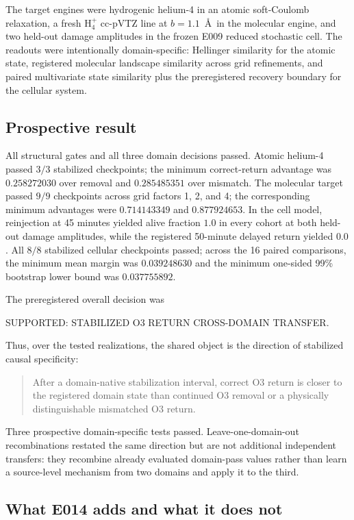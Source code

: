 \documentclass[11pt,a4paper]{article}
\newcommand{\statussupported}{\textsf{SUPPORTED}}
\begin{document}
The target engines were hydrogenic helium-4 in an atomic soft-Coulomb relaxation, a fresh H$_4^+$ cc-pVTZ line at $b=1.1$~\AA\ in the molecular engine, and two held-out damage amplitudes in the frozen E009 reduced stochastic cell. The readouts were intentionally domain-specific: Hellinger similarity for the atomic state, registered molecular landscape similarity across grid refinements, and paired multivariate state similarity plus the preregistered recovery boundary for the cellular system.

\subsection{Prospective result}

All structural gates and all three domain decisions passed. Atomic helium-4 passed $3/3$ stabilized checkpoints; the minimum correct-return advantage was $0.258272030$ over removal and $0.285485351$ over mismatch. The molecular target passed $9/9$ checkpoints across grid factors 1, 2, and 4; the corresponding minimum advantages were $0.714143349$ and $0.877924653$. In the cell model, reinjection at 45 minutes yielded alive fraction $1.0$ in every cohort at both held-out damage amplitudes, while the registered 50-minute delayed return yielded $0.0$. All $8/8$ stabilized cellular checkpoints passed; across the 16 paired comparisons, the minimum mean margin was $0.039248630$ and the minimum one-sided 99\% bootstrap lower bound was $0.037755892$.

The preregistered overall decision was
\begin{center}
\statussupported: \textsf{STABILIZED O3 RETURN CROSS-DOMAIN TRANSFER}.
\end{center}
Thus, over the tested realizations, the shared object is the direction of stabilized causal specificity:
\begin{quote}
After a domain-native stabilization interval, correct O3 return is closer to the registered domain state than continued O3 removal or a physically distinguishable mismatched O3 return.
\end{quote}
Three prospective domain-specific tests passed. Leave-one-domain-out recombinations restated the same direction but are not additional independent transfers: they recombine already evaluated domain-pass values rather than learn a source-level mechanism from two domains and apply it to the third.

\subsection{What E014 adds and what it does not}
\end{document}

